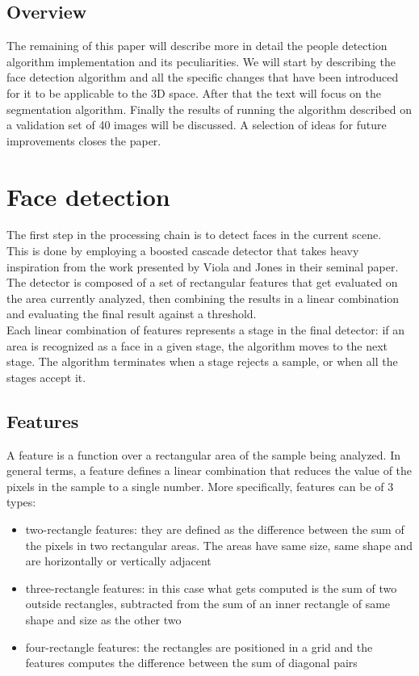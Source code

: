 \documentclass[a4paper,11pt,titlepage]{article}
\begin{document}
\subsection*{Overview}
The remaining of this paper will describe more in detail the people detection
algorithm implementation and its peculiarities. We will start by describing the
face detection algorithm and all the specific changes that have been introduced
for it to be applicable to the 3D space. After that the text will focus on the
segmentation algorithm. Finally the results of running the algorithm described
on a validation set of 40 images will be discussed. A selection of ideas for
future improvements closes the paper.

\section{Face detection}
The first step in the processing chain is to detect faces in the current scene.  \\
This is done by employing a boosted cascade detector that takes heavy
inspiration from the work presented by Viola and Jones in their seminal paper.  \\
The detector is composed of a set of rectangular features that get evaluated on
the area currently analyzed, then combining the results in a linear combination
and evaluating the final result against a threshold. \\
Each linear combination of features represents a stage in the final detector: if
an area is recognized as a face in a given stage, the algorithm moves to the
next stage. The algorithm terminates when a stage rejects a sample, or when all
the stages accept it.

\subsection{Features}
A feature is a function over a rectangular area of the sample being analyzed. In
general terms, a feature defines a linear combination that reduces the value of
the pixels in the sample to a single number. More specifically, features can be
of 3 types:

\begin{itemize}
  \item two-rectangle features: they are defined as the difference between the sum of
  the pixels in two rectangular areas. The areas have same size, same shape and
  are horizontally or vertically adjacent
  \item three-rectangle features: in this case what gets computed is the sum of two
  outside rectangles, subtracted from the sum of an inner rectangle of same
  shape and size as the other two
  \item four-rectangle features: the rectangles are positioned in a grid and the
  features computes the difference between the sum of diagonal pairs
\end{itemize}
\end{document}
